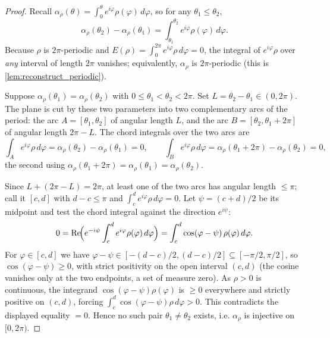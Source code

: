 \begin{proof}
  \leanok
  Recall $\alpha_\rho(\theta) = \int_0^\theta e^{i\varphi}\rho(\varphi)\,d\varphi$,
  so for any $\theta_1 \le \theta_2$,
  \[
    \alpha_\rho(\theta_2) - \alpha_\rho(\theta_1)
      = \int_{\theta_1}^{\theta_2} e^{i\varphi}\rho(\varphi)\,d\varphi .
  \]
  Because $\rho$ is $2\pi$-periodic and $E(\rho) = \int_0^{2\pi}
  e^{i\varphi}\rho\,d\varphi = 0$, the integral of $e^{i\varphi}\rho$ over
  \emph{any} interval of length $2\pi$ vanishes; equivalently, $\alpha_\rho$ is
  $2\pi$-periodic (this is \cref{lem:reconstruct_periodic}).

  Suppose $\alpha_\rho(\theta_1) = \alpha_\rho(\theta_2)$ with $0 \le \theta_1 <
  \theta_2 < 2\pi$. Set $L = \theta_2 - \theta_1 \in (0, 2\pi)$. The plane is cut
  by these two parameters into two complementary arcs of the period: the arc
  $A = [\theta_1, \theta_2]$ of angular length $L$, and the arc $B =
  [\theta_2, \theta_1 + 2\pi]$ of angular length $2\pi - L$. The chord integrals
  over the two arcs are
  \[
    \int_A e^{i\varphi}\rho\,d\varphi = \alpha_\rho(\theta_2) -
      \alpha_\rho(\theta_1) = 0,
    \qquad
    \int_B e^{i\varphi}\rho\,d\varphi = \alpha_\rho(\theta_1 + 2\pi) -
      \alpha_\rho(\theta_2) = 0,
  \]
  the second using $\alpha_\rho(\theta_1 + 2\pi) = \alpha_\rho(\theta_1) =
  \alpha_\rho(\theta_2)$.

  Since $L + (2\pi - L) = 2\pi$, at least one of the two arcs has angular length
  $\le \pi$; call it $[c, d]$ with $d - c \le \pi$ and $\int_c^d
  e^{i\varphi}\rho\,d\varphi = 0$. Let $\psi = (c + d)/2$ be its midpoint and test
  the chord integral against the direction $e^{i\psi}$:
  \[
    0 = \operatorname{Re}\!\Bigl(e^{-i\psi}\int_c^d e^{i\varphi}\rho(\varphi)\,
      d\varphi\Bigr)
      = \int_c^d \cos(\varphi - \psi)\,\rho(\varphi)\,d\varphi .
  \]
  For $\varphi \in [c, d]$ we have $\varphi - \psi \in [-(d-c)/2, (d-c)/2]
  \subseteq [-\pi/2, \pi/2]$, so $\cos(\varphi - \psi) \ge 0$, with strict
  positivity on the open interval $(c, d)$ (the cosine vanishes only at the two
  endpoints, a set of measure zero). As $\rho > 0$ is continuous, the integrand
  $\cos(\varphi - \psi)\rho(\varphi)$ is $\ge 0$ everywhere and strictly positive
  on $(c, d)$, forcing $\int_c^d \cos(\varphi - \psi)\rho\,d\varphi > 0$. This
  contradicts the displayed equality $= 0$. Hence no such pair $\theta_1 \ne
  \theta_2$ exists, i.e. $\alpha_\rho$ is injective on $[0, 2\pi)$.
\end{proof}

